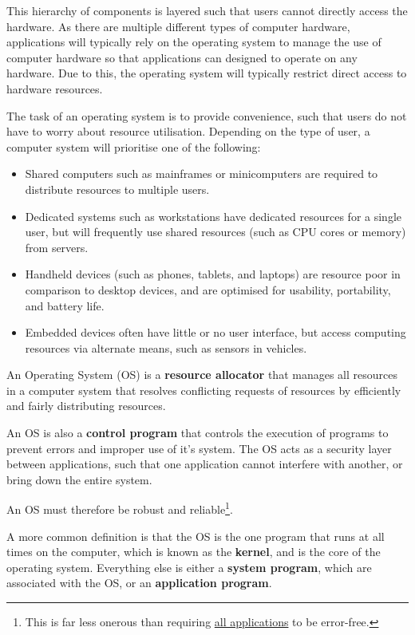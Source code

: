 \documentclass{article}
\begin{document}
This hierarchy of components is layered such that users cannot directly
access the hardware. As there are multiple different types of computer
hardware, applications will typically rely on the operating system to
manage the use of computer hardware so that applications can designed
to operate on any hardware. Due to this, the operating system will
typically restrict direct access to hardware resources.

The task of an operating system is to provide convenience, such that
users do not have to worry about resource utilisation. Depending on the
type of user, a computer system will prioritise one of the following:
\begin{itemize}
    \item Shared computers such as mainframes or minicomputers are
          required to distribute resources to multiple users.
    \item Dedicated systems such as workstations have dedicated
          resources for a single user, but will frequently use shared
          resources (such as CPU cores or memory) from servers.
    \item Handheld devices (such as phones, tablets, and laptops) are
          resource poor in comparison to desktop devices, and are
          optimised for usability, portability, and battery life.
    \item Embedded devices often have little or no user interface, but
          access computing resources via alternate means, such as
          sensors in vehicles.
\end{itemize}
\begin{definition}
    An Operating System (OS) is a \textbf{resource allocator} that
    manages all resources in a computer system that resolves conflicting
    requests of resources by efficiently and fairly distributing
    resources.

    An OS is also a \textbf{control program} that controls the
    execution of programs to prevent errors and improper use of it's
    system. The OS acts as a security layer between applications, such
    that one application cannot interfere with another, or bring down
    the entire system.

    An OS must therefore be robust and reliable\footnote{This is far
    less onerous than requiring \underline{all applications} to be
    error-free. }.
\end{definition}
A more common definition is that the OS is the one program that runs
at all times on the computer, which is known as the \textbf{kernel},
and is the core of the operating system.
Everything else is either a \textbf{system program}, which are
associated with the OS, or an \textbf{application program}.
\end{document}

